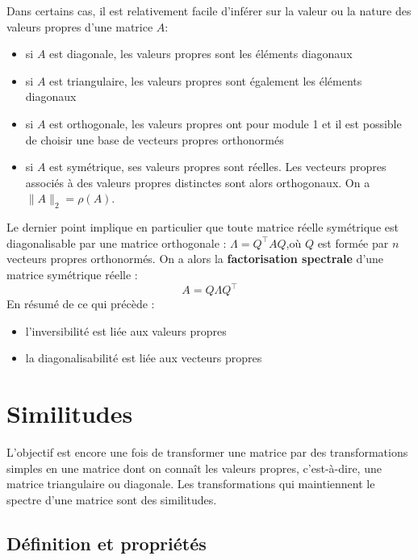 Dans certains cas, il est relativement facile d'inférer sur la valeur ou la nature des valeurs propres d'une matrice $A$:
\begin{itemize}
	\item si $A$ est diagonale, les valeurs propres sont les éléments diagonaux
	\item si $A$ est triangulaire, les valeurs propres sont également les éléments diagonaux
	\item si $A$ est orthogonale, les valeurs propres ont pour module 1 et il est possible de choisir une base de vecteurs propres orthonormés
	\item si $A$ est symétrique, ses valeurs propres sont réelles. Les vecteurs propres associés à des valeurs propres distinctes sont 
alors orthogonaux. On a $\|A\|_2=\rho(A)$.
\end{itemize}
Le dernier point implique en particulier que toute matrice réelle symétrique est diagonalisable par une matrice orthogonale : $\Lambda=Q^\top AQ$,où $Q$ est formée par $n$ vecteurs propres orthonormés. On a alors la \textbf{factorisation spectrale} 
d'une matrice symétrique réelle :
$$A=Q\Lambda Q^\top $$
\vskip 10pt
En résumé de ce qui précède :
{\gr 
\begin{itemize}
	\item l'inversibilité est liée aux valeurs propres
	\item la diagonalisabilité est liée aux vecteurs propres
\end{itemize}
}

\section{Similitudes}  %
L'objectif est encore une fois de transformer une matrice par des transformations simples en une matrice dont on connaît les valeurs propres, c'est-à-dire, une matrice triangulaire ou diagonale. Les transformations qui maintiennent le spectre d'une matrice sont des similitudes.

\subsection{Définition et propriétés} %

